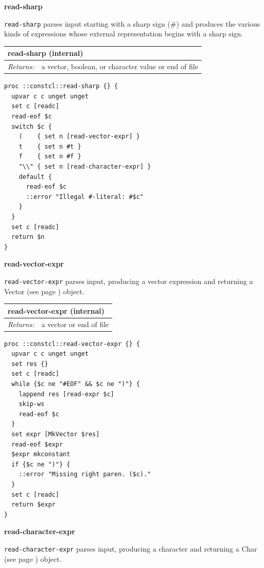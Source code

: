 \documentclass[twoside,9pt]{report}
\begin{document}
\textbf{read-sharp}


\texttt{read-sharp} parses input starting with a sharp sign (\#) and produces the various kinds of expressions whose external representation begins with a sharp sign.

\begin{tabular}{ |l l| }
\hline
\multicolumn{2}{|l|}{read-sharp (internal)} \\
\hline
\textit{Returns:} & a vector, boolean, or character value or end of file \\
\hline
\end{tabular}

\noindent\makebox[\linewidth]{\rule{\linewidth}{0.4pt}}
\begin{lstlisting}
proc ::constcl::read-sharp {} {
  upvar c c unget unget
  set c [readc]
  read-eof $c
  switch $c {
    (    { set n [read-vector-expr] }
    t    { set n #t }
    f    { set n #f }
    "\\" { set n [read-character-expr] }
    default {
      read-eof $c
      ::error "Illegal #-literal: #$c"
    }
  }
  set c [readc]
  return $n
}
\end{lstlisting}
\noindent\makebox[\linewidth]{\rule{\linewidth}{0.4pt}}

\textbf{read-vector-expr}


\texttt{read-vector-expr} parses input, producing a vector expression and returning a Vector (see page \pageref{vectors}) object.

\begin{tabular}{ |l l| }
\hline
\multicolumn{2}{|l|}{read-vector-expr (internal)} \\
\hline
\textit{Returns:} & a vector or end of file \\
\hline
\end{tabular}

\noindent\makebox[\linewidth]{\rule{\linewidth}{0.4pt}}
\begin{lstlisting}
proc ::constcl::read-vector-expr {} {
  upvar c c unget unget
  set res {}
  set c [readc]
  while {$c ne "#EOF" && $c ne ")"} {
    lappend res [read-expr $c]
    skip-ws
    read-eof $c
  }
  set expr [MkVector $res]
  read-eof $expr
  $expr mkconstant
  if {$c ne ")"} {
    ::error "Missing right paren. ($c)."
  }
  set c [readc]
  return $expr
}
\end{lstlisting}
\noindent\makebox[\linewidth]{\rule{\linewidth}{0.4pt}}

\textbf{read-character-expr}


\texttt{read-character-expr} parses input, producing a character and returning a Char (see page \pageref{characters}) object.
\end{document}
